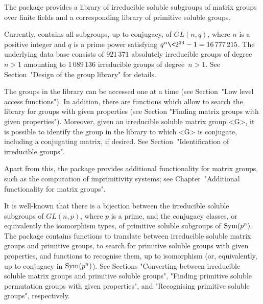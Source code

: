 

The package {\IRREDSOL} provides a library of irreducible
soluble subgroups of matrix groups over finite fields and a corresponding library of primitive soluble groups.

Currently, {\IRREDSOL} contains all subgroups, up to conjugacy, of $GL(n, q)$, 
where $n$ is a positive integer and $q$
is a prime power satisfying  $q^n \< 2^{24} - 1 = 16\,777\,215$. The underlying data base consists of 
$ 921\,371$ absolutely irreducible groups of degree $n > 1$ amounting to $1\,089\,136$ irreducible groups of degree~$n>1$. See Section~"Design of the group library" for details.

The groups in the {\IRREDSOL} 
library can be accessed one at a time (see Section~"Low
level access functions"). In addition, there are functions which allow to 
search the library for groups with given properties (see Section "Finding
matrix groups with given properties"). Moreover, given an irreducible soluble matrix group
<G>, it is possible to identify the group in the library to which <G> is conjugate,
including a conjugating matrix, if desired. See Section~"Identification of irreducible
groups".

Apart from this, the {\IRREDSOL} package provides additional functionality
for matrix groups, such as the computation of imprimitivity systems;
see Chapter~"Additional functionality for matrix groups".

It is well-known that there is a bijection between the  irreducible soluble subgroups of
$GL(n, p)$, where
$p$ is a prime, and the conjugacy classes, or equivalently the isomorphism types, of
primitive soluble subgroups of ${\rm Sym}(p^n)$. The {\IRREDSOL} package contains
functions to translate between irreducible soluble matrix groups and primitive
groups, to search for primitive soluble groups with given  properties, and functions to
recognise them, up to isomorphism (or, equivalently, up to conjugacy in ${\rm Sym}(p^n)$).  See Sections "Converting between irreducible soluble
matrix groups and primitive soluble groups", "Finding primitive soluble permutation
groups with given properties", and "Recognising primitive soluble groups", respectively.

